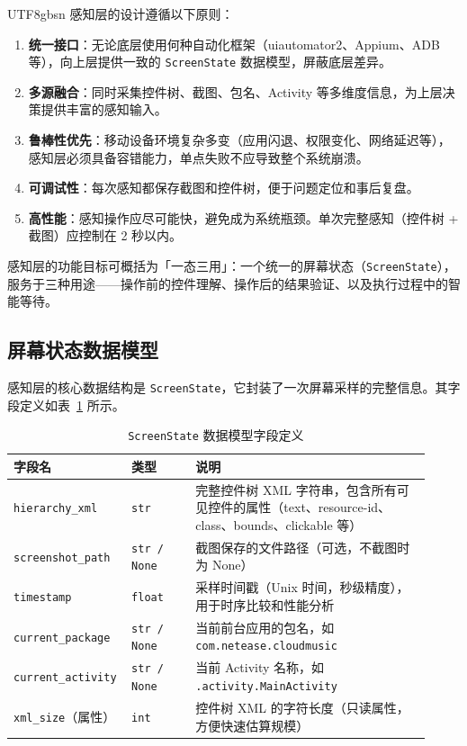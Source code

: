 \documentclass{article}
\begin{document}
\begin{CJK}{UTF8}{gbsn}
感知层的设计遵循以下原则：

\begin{enumerate}[leftmargin=1.5em]
  \item \textbf{统一接口}：无论底层使用何种自动化框架（uiautomator2、Appium、ADB 等），向上层提供一致的 \texttt{ScreenState} 数据模型，屏蔽底层差异。
  \item \textbf{多源融合}：同时采集控件树、截图、包名、Activity 等多维度信息，为上层决策提供丰富的感知输入。
  \item \textbf{鲁棒性优先}：移动设备环境复杂多变（应用闪退、权限变化、网络延迟等），感知层必须具备容错能力，单点失败不应导致整个系统崩溃。
  \item \textbf{可调试性}：每次感知都保存截图和控件树，便于问题定位和事后复盘。
  \item \textbf{高性能}：感知操作应尽可能快，避免成为系统瓶颈。单次完整感知（控件树 + 截图）应控制在 2 秒以内。
\end{enumerate}

感知层的功能目标可概括为「一态三用」：一个统一的屏幕状态（\texttt{ScreenState}），服务于三种用途——操作前的控件理解、操作后的结果验证、以及执行过程中的智能等待。

\subsection{屏幕状态数据模型}

感知层的核心数据结构是 \texttt{ScreenState}，它封装了一次屏幕采样的完整信息。其字段定义如表~\ref{tab:screen_state} 所示。

\begin{table}[h]
  \centering
  \caption{\texttt{ScreenState} 数据模型字段定义}
  \label{tab:screen_state}
  \begin{tabular}{p{0.22\linewidth}p{0.15\linewidth}p{0.55\linewidth}}
    \toprule
    字段名 & 类型 & 说明 \\
    \midrule
    \texttt{hierarchy\_xml} & \texttt{str} & 完整控件树 XML 字符串，包含所有可见控件的属性（text、resource-id、class、bounds、clickable 等）\\
    \texttt{screenshot\_path} & \texttt{str / None} & 截图保存的文件路径（可选，不截图时为 None）\\
    \texttt{timestamp} & \texttt{float} & 采样时间戳（Unix 时间，秒级精度），用于时序比较和性能分析 \\
    \texttt{current\_package} & \texttt{str / None} & 当前前台应用的包名，如 \texttt{com.netease.cloudmusic} \\
    \texttt{current\_activity} & \texttt{str / None} & 当前 Activity 名称，如 \texttt{.activity.MainActivity} \\
    \midrule
    \texttt{xml\_size}（属性） & \texttt{int} & 控件树 XML 的字符长度（只读属性，方便快速估算规模）\\
    \bottomrule
  \end{tabular}
\end{table}


\end{CJK}
\end{document}
